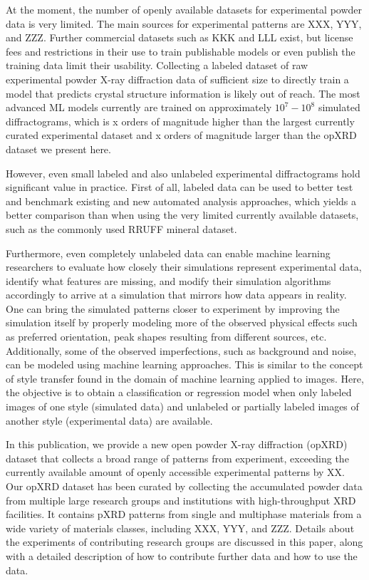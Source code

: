 At the moment, the number of openly available datasets for experimental powder data is very limited.
The main sources for experimental patterns are XXX, YYY, and ZZZ.
Further commercial datasets such as KKK and LLL exist, but license fees and restrictions in their use to train publishable models or even publish the training data limit their usability.
Collecting a labeled dataset of raw experimental powder X-ray diffraction data of sufficient size to directly train a model that predicts crystal structure information is likely out of reach.
The most advanced ML models currently are trained on approximately $10^7 - 10^8$ simulated diffractograms, which is x orders of magnitude higher than the largest currently curated experimental dataset and x orders of magnitude larger than the opXRD dataset we present here.

However, even small labeled and also unlabeled experimental diffractograms hold significant value in practice. First of all, labeled data can be used to better test and benchmark existing and new automated analysis approaches, which yields a better comparison than when using the very limited currently available datasets, such as the commonly used RRUFF mineral dataset.

Furthermore, even completely unlabeled data can enable machine learning researchers to evaluate how closely their simulations represent experimental data, identify what features are missing, and modify their simulation algorithms accordingly to arrive at a simulation that mirrors how data appears in reality.
One can bring the simulated patterns closer to experiment by improving the simulation itself by properly modeling more of the observed physical effects such as preferred orientation, peak shapes resulting from different sources, etc.
Additionally, some of the observed imperfections, such as background and noise, can be modeled using machine learning approaches.
This is similar to the concept of style transfer\cite{Gatys2016, Ganin2015} found in the domain of machine learning applied to images.
Here, the objective is to obtain a classification or regression model when only labeled images of one style (simulated data) and unlabeled or partially labeled images of another style (experimental data) are available.

In this publication, we provide a new open powder X-ray diffraction (opXRD) dataset that collects a broad range of patterns from experiment, exceeding the currently available amount of openly accessible experimental patterns by XX.
Our opXRD dataset has been curated by collecting the accumulated powder data from multiple large research groups and institutions with high-throughput XRD facilities. It contains pXRD patterns from single and multiphase materials from a wide variety of materials classes, including XXX, YYY, and ZZZ. Details about the experiments of contributing research groups are discussed in this paper, along with a detailed description of how to contribute further data and how to use the data.

